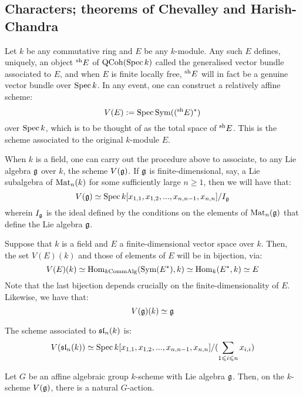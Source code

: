     \subsection{Characters; theorems of Chevalley and Harish-Chandra}
        \begin{convention}
            Let $k$ be any commutative ring and $E$ be any $k$-module. Any such $E$ defines, uniquely, an object ${}^{\sh}E$ of $\QCoh(\Spec k)$ called the generalised vector bundle associated to $E$, and when $E$ is finite locally free, ${}^{\sh}E$ will in fact be a genuine vector bundle over $\Spec k$. In any event, one can construct a relatively affine scheme:
                $$V(E) := \Spec \Sym(({}^{\sh}E)^*)$$
            over $\Spec k$, which is to be thought of as the total space of ${}^{\sh}E$. This is the scheme associated to the original $k$-module $E$. 

            When $k$ is a field, one can carry out the procedure above to associate, to any Lie algebra $\g$ over $k$, the scheme $V(\g)$. If $\g$ is finite-dimensional, say, a Lie subalgebra of $\Mat_n(k)$ for some sufficiently large $n \geq 1$, then we will have that:
                $$V(\g) \cong \Spec k[x_{1, 1}, x_{1, 2}, ..., x_{n, n - 1}, x_{n, n}]/I_{\g}$$
            wherein $I_{\g}$ is the ideal defined by the conditions on the elements of $\Mat_n(\g)$ that define the Lie algebra $\g$. 
        \end{convention}
        \begin{remark}
            Suppose that $k$ is a field and $E$ a finite-dimensional vector space over $k$. Then, the set $V(E)(k)$ and those of elements of $E$ will be in bijection, via:
                $$V(E)(k) \cong \Hom_{k\Comm\Alg}(\Sym(E^*), k) \cong \Hom_k(E^*, k) \cong E$$
            Note that the last bijection depends crucially on the finite-dimensionality of $E$. Likewise, we have that:
                $$V(\g)(k) \cong \g$$
        \end{remark}
        \begin{example}
            The scheme associated to $\sl_n(k)$ is:
                $$V(\sl_n(k)) \cong \Spec k[x_{1, 1}, x_{1, 2}, ..., x_{n, n - 1}, x_{n, n}]/( \sum_{1 \leq i \leq n} x_{i, i} )$$
        \end{example}
        \begin{remark}
            Let $G$ be an affine algebraic group $k$-scheme with Lie algebra $\g$. Then, on the $k$-scheme $V(\g)$, there is a natural $G$-action. 
        \end{remark}
